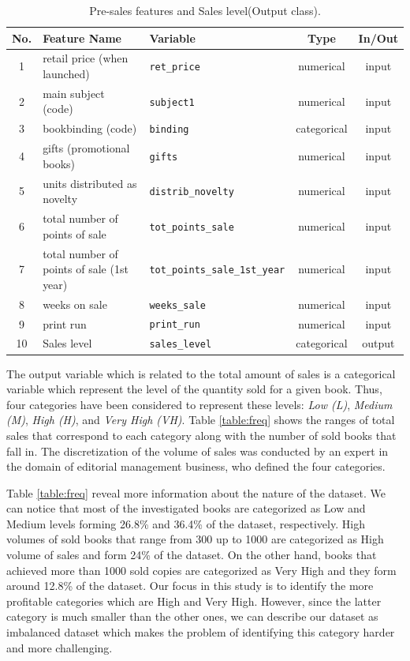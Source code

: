\documentclass[a4paper,10pt,onecolumn,preprint,3p]{elsarticle}
\begin{document}
\begin{table}
\caption{Pre-sales features and Sales level(Output class). } 
\label{tabla:params_pre_sales}
\begin{center}
\begin{tabular}{|c|l|l|c|c|}
\hline 
No. & Feature Name & Variable & Type & In/Out\\
\hline 
1 & retail price (when launched) & \texttt{ret\_price} & numerical & input\\
2 & main subject (code) & \texttt{subject1} & numerical & input\\
3 & bookbinding (code) & \texttt{binding} & categorical & input\\
4 & gifts (promotional books) & \texttt{gifts} & numerical & input\\
5 & units distributed as novelty & \texttt{distrib\_novelty} & numerical & input\\
6 & total number of points of sale & \texttt{tot\_points\_sale} & numerical & input\\
7 & total number of points of sale (1st year) & \texttt{tot\_points\_sale\_1st\_year} & numerical & input\\
8 & weeks on sale & \texttt{weeks\_sale} & numerical & input\\
9 & print run & \texttt{print\_run} & numerical & input\\
\hline 
\hline
10 & Sales level & \texttt{sales\_level} & categorical & output\\
\hline 
\end{tabular}
\end{center}
\end{table}


The output variable which is related to the total amount of sales is a categorical variable which represent the level of the quantity sold for a given book. Thus, four categories have been considered to represent these levels: \textit{Low (L)}, \textit{Medium (M)}, \textit{High (H)}, and \textit{Very High (VH)}. Table \ref{table:freq} shows the ranges of total sales that correspond to each category along with the number of sold books that fall in. The discretization of the volume of sales was conducted by an expert in the domain of editorial management business, who defined the four categories.

Table \ref{table:freq} reveal more information about the nature of the dataset. We can notice that most of the investigated books are categorized as Low and Medium levels forming 26.8\% and 36.4\% of the dataset, respectively. High volumes of sold books that range from 300 up to 1000 are categorized as High volume of sales and form 24\% of the dataset. On the other hand, books that achieved more than 1000 sold copies are categorized as Very High and they form around 12.8\% of the dataset. Our focus in this study is to identify the more profitable categories which are High and Very High. However, since the latter category is much smaller than the other ones, we can describe our dataset as imbalanced dataset which makes the problem of identifying this category harder and more challenging.
\end{document}
